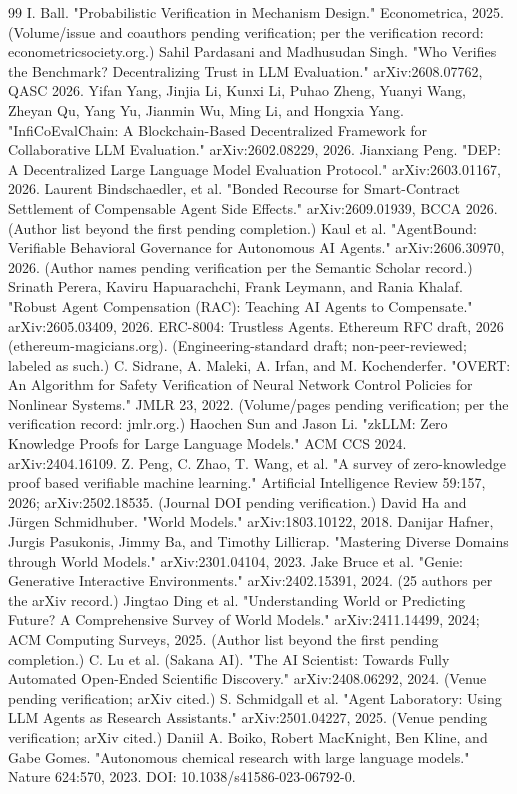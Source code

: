 \documentclass[11pt,a4paper]{article}
\begin{document}
\begin{thebibliography}{99}
 I. Ball. "Probabilistic Verification in Mechanism Design." Econometrica, 2025. (Volume/issue and coauthors pending verification; per the verification record: econometricsociety.org.)
 Sahil Pardasani and Madhusudan Singh. "Who Verifies the Benchmark? Decentralizing Trust in LLM Evaluation." arXiv:2608.07762, QASC 2026.
 Yifan Yang, Jinjia Li, Kunxi Li, Puhao Zheng, Yuanyi Wang, Zheyan Qu, Yang Yu, Jianmin Wu, Ming Li, and Hongxia Yang. "InfiCoEvalChain: A Blockchain-Based Decentralized Framework for Collaborative LLM Evaluation." arXiv:2602.08229, 2026.
 Jianxiang Peng. "DEP: A Decentralized Large Language Model Evaluation Protocol." arXiv:2603.01167, 2026.
 Laurent Bindschaedler, et al. "Bonded Recourse for Smart-Contract Settlement of Compensable Agent Side Effects." arXiv:2609.01939, BCCA 2026. (Author list beyond the first pending completion.)
 Kaul et al. "AgentBound: Verifiable Behavioral Governance for Autonomous AI Agents." arXiv:2606.30970, 2026. (Author names pending verification per the Semantic Scholar record.)
 Srinath Perera, Kaviru Hapuarachchi, Frank Leymann, and Rania Khalaf. "Robust Agent Compensation (RAC): Teaching AI Agents to Compensate." arXiv:2605.03409, 2026.
 ERC-8004: Trustless Agents. Ethereum RFC draft, 2026 (ethereum-magicians.org). (Engineering-standard draft; non-peer-reviewed; labeled as such.)
 C. Sidrane, A. Maleki, A. Irfan, and M. Kochenderfer. "OVERT: An Algorithm for Safety Verification of Neural Network Control Policies for Nonlinear Systems." JMLR 23, 2022. (Volume/pages pending verification; per the verification record: jmlr.org.)
 Haochen Sun and Jason Li. "zkLLM: Zero Knowledge Proofs for Large Language Models." ACM CCS 2024. arXiv:2404.16109.
 Z. Peng, C. Zhao, T. Wang, et al. "A survey of zero-knowledge proof based verifiable machine learning." Artificial Intelligence Review 59:157, 2026; arXiv:2502.18535. (Journal DOI pending verification.)
 David Ha and Jürgen Schmidhuber. "World Models." arXiv:1803.10122, 2018.
 Danijar Hafner, Jurgis Pasukonis, Jimmy Ba, and Timothy Lillicrap. "Mastering Diverse Domains through World Models." arXiv:2301.04104, 2023.
 Jake Bruce et al. "Genie: Generative Interactive Environments." arXiv:2402.15391, 2024. (25 authors per the arXiv record.)
 Jingtao Ding et al. "Understanding World or Predicting Future? A Comprehensive Survey of World Models." arXiv:2411.14499, 2024; ACM Computing Surveys, 2025. (Author list beyond the first pending completion.)
 C. Lu et al. (Sakana AI). "The AI Scientist: Towards Fully Automated Open-Ended Scientific Discovery." arXiv:2408.06292, 2024. (Venue pending verification; arXiv cited.)
 S. Schmidgall et al. "Agent Laboratory: Using LLM Agents as Research Assistants." arXiv:2501.04227, 2025. (Venue pending verification; arXiv cited.)
 Daniil A. Boiko, Robert MacKnight, Ben Kline, and Gabe Gomes. "Autonomous chemical research with large language models." Nature 624:570, 2023. DOI: 10.1038/s41586-023-06792-0.
\end{thebibliography}
\end{document}
